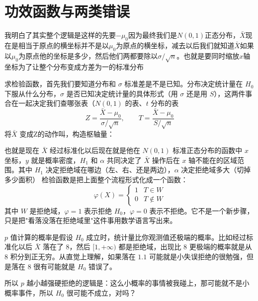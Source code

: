\section{功效函数与两类错误}
\begin{dxtips}[构造检验统计量]
    我明白了其实整个逻辑是这样的先要$-\mu_0$因为最终我们是$N(0,1)$正态分布，$\bar{X}$现在是相当于原点的横坐标并不是以$\mu_0$为原点的横坐标，减去以后我们就知道$\bar{X}$如果以$\mu_0$为原点他的坐标是多少，然后他们两都要除以$\sigma/\sqrt{n}$。也就是要同时缩放$x$轴坐标为了让整个分布变成方差为一的标准分布
\end{dxtips}
\begin{dxtips}
    求检验函数，首先我们要知道分布和 $\sigma$ 标准差是不是已知。分布决定统计量在 $H_0$ 下服从什么分布，$\sigma$ 是否已知决定统计量的具体形式（用 $\sigma$ 还是用 $S$），这两件事合在一起决定我们查哪张表（$N(0,1)$ 的表、$t$ 分布的表 
$$Z = \frac{\bar X - \mu_0}{\sigma/\sqrt{n}}, \qquad T = \frac{\bar X - \mu_0}{S/\sqrt{n}}$$
将$\bar{X}$ 变成Z的动作叫，构造枢轴量：
\end{dxtips}
\begin{note}
   
也就是现在 $\bar{X}$ 经过标准化以后现在就是他在 $N(0,1)$ 标准正态分布的函数中 $x$ 坐标，$y$ 就是概率密度，$H_1$ 和 $\alpha$ 共同决定了 $\bar{X}$ 操作后在 $x$ 轴不能在的区域范围。其中 $H_1$ 决定拒绝域在哪边（左、右、还是两边），$\alpha$ 决定拒绝域多大（切掉多少面积）
检验函数是把上面整个流程形式化成一个函数：
$$\varphi(X) = \begin{cases} 1 & T \in W \\ 0 & T \notin W \end{cases}$$
其中 $W$ 是拒绝域，$\varphi = 1$ 表示拒绝 $H_0$，$\varphi = 0$ 表示不拒绝。它不是一个新步骤，只是把"看落没落在拒绝域里"这件事用数学语言写出来。
\end{note}
\begin{dxtips}
$p$ 值计算的概率是假设 $H_0$ 成立时，统计量比你观测值还极端的概率。比如经过标准化以后 $\bar{X}$ 落在了 $8$，然后 $[1, +\infty)$ 都是拒绝域，出现比 $8$ 更极端的概率就是从 $8$ 积分到正无穷。从直觉上理解，如果落在 $1.1$ 可能就是小失误拒绝的很勉强，但是落在 $8$ 很有可能就是 $H_0$ 错误了。

所以 $p$ 越小越强硬拒绝的逻辑是：这么小概率的事情被我碰上，那可能就不是小概率事件，所以 $H_0$ 很可能不成立，对吗？
\end{dxtips}

